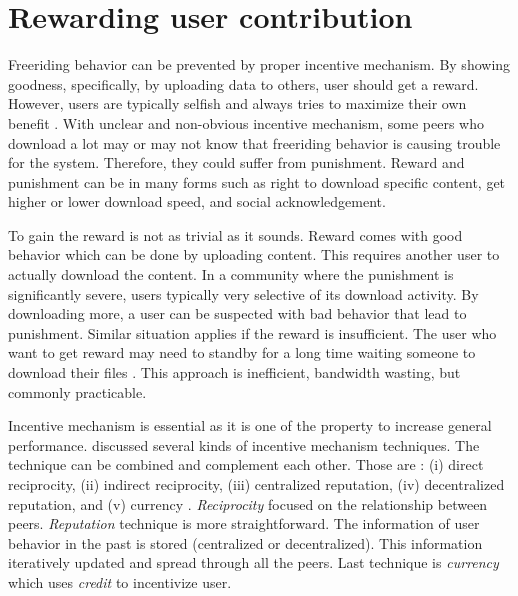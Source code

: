\section{Rewarding user contribution}
\label{sec:userreward}
Freeriding behavior can be prevented by proper incentive mechanism. By showing goodness, specifically, by uploading data to others, user should get a reward. However, users are typically selfish and always tries to maximize their own benefit \cite{2015:incentivep2pgame:kang}. With unclear and non-obvious incentive mechanism, some peers who download a lot may or may not know that freeriding behavior is causing trouble for the system. Therefore, they could suffer from punishment. Reward and punishment can be in many forms such as right to download specific content, get higher or lower download speed, and social acknowledgement.

To gain the reward is not as trivial as it sounds. Reward comes with good behavior which can be done by uploading content. This requires another user to actually download the content. In a community where the punishment is significantly severe, users typically very selective of its download activity. By downloading more, a user can be suspected with bad behavior that lead to punishment. Similar situation applies if the reward is insufficient. The user who want to get reward may need to standby for a long time waiting someone to download their files \cite{2013:survivepriv:jia}. This approach is inefficient, bandwidth wasting, but commonly practicable\cite{2013:survivepriv:jia}.

Incentive mechanism is essential as it is one of the property to increase general performance. \citeauthor{2011:managesupplydemand:meulpolder} discussed several kinds of incentive mechanism techniques. The technique can be combined and complement each other. Those are : (i) direct reciprocity, (ii) indirect reciprocity, (iii) centralized reputation, (iv) decentralized reputation, and (v) currency \cite{2011:managesupplydemand:meulpolder}. \textit{Reciprocity} focused on the relationship between peers.  \textit{Reputation} technique is more straightforward. The information of user behavior in the past is stored (centralized or decentralized). This information iteratively updated and spread through all the peers. Last technique is \textit{currency} which uses \textit{credit} to incentivize user.

